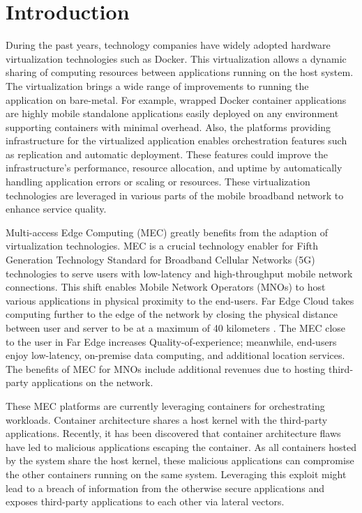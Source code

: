 \chapter{Introduction}
\label{chapter:intro}

During the past years, technology companies have widely adopted hardware virtualization technologies such as Docker. This virtualization allows a dynamic sharing of computing resources between applications running on the host system. The virtualization brings a wide range of improvements to running the application on bare-metal. For example, wrapped Docker container applications are highly mobile standalone applications easily deployed on any environment supporting containers with minimal overhead. Also, the platforms providing infrastructure for the virtualized application enables orchestration features such as replication and automatic deployment. These features could improve the infrastructure's performance, resource allocation, and uptime by automatically handling application errors or scaling or resources. These virtualization technologies are leveraged in various parts of the mobile broadband network to enhance service quality.

Multi-access Edge Computing (MEC) greatly benefits from the adaption of virtualization technologies. MEC is a crucial technology enabler for Fifth Generation Technology Standard for Broadband Cellular Networks (5G) technologies to serve users with low-latency and high-throughput mobile network connections. This shift enables Mobile Network Operators (MNOs) to host various applications in physical proximity to the end-users. Far Edge Cloud takes computing further to the edge of the network by closing the physical distance between user and server to be at a maximum of 40 kilometers \cite{AirFrameOpenEdgeServer}. The MEC close to the user in Far Edge increases Quality-of-experience; meanwhile, end-users enjoy low-latency, on-premise data computing, and additional location services. The benefits of MEC for MNOs include additional revenues due to hosting third-party applications on the network.

These MEC platforms are currently leveraging containers for orchestrating workloads. Container architecture shares a host kernel with the third-party applications. Recently, it has been discovered that container architecture flaws have led to malicious applications escaping the container. As all containers hosted by the system share the host kernel, these malicious applications can compromise the other containers running on the same system. Leveraging this exploit might lead to a breach of information from the otherwise secure applications and exposes third-party applications to each other via lateral vectors.

